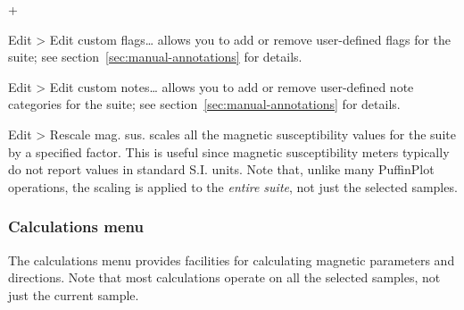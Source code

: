\documentclass[a4paper]{article}
\newcommand{\menuitemlabel}[1]{%
\mbox{\textsf{#1}}\hfil}
\newenvironment{menuitemlist}%
{\begin{list}{}{%
\renewcommand{\makelabel}{\menuitemlabel}%
\setlength{\labelwidth}{35pt}%
\setlength{\leftmargin}%
             {\labelwidth+\labelsep}}}%
{\end{list}}
\newcommand{\submenu}{ \textgreater{} } %
\begin{document}
\begin{menuitemlist}

\item[Edit\submenu Edit custom flags\ldots] allows you to add or remove
user-defined flags for the suite; see section~\ref{sec:manual-annotations}
for details.

\item[Edit\submenu Edit custom notes\ldots] allows you to add or remove
  user-defined note categories for the suite; see
  section~\ref{sec:manual-annotations} for details.

\item[Edit\submenu Rescale mag. sus.] scales all the magnetic
susceptibility values for the suite by a specified factor. This is
useful since magnetic susceptibility meters typically do not report
values in standard S.I. units. Note that, unlike many PuffinPlot operations,
the scaling is applied to the {\em entire suite}, not just the selected
samples.

\end{menuitemlist}

\subsubsection{\label{sec:manual-functions-calcs}Calculations menu}

The calculations menu provides facilities for calculating magnetic
parameters and directions. Note that most calculations operate on
all the selected samples, not just the current sample.
\end{document}
